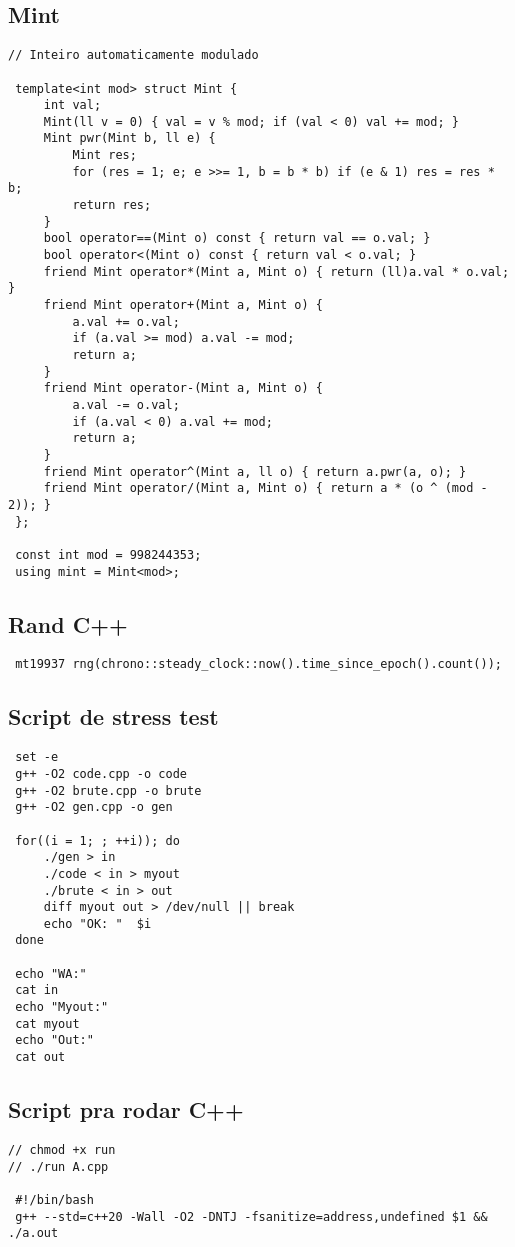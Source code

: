 \documentclass[11pt, a4paper, twoside]{article}
\begin{document}
\subsection{Mint}
\begin{lstlisting}
// Inteiro automaticamente modulado

 template<int mod> struct Mint {
     int val;
     Mint(ll v = 0) { val = v % mod; if (val < 0) val += mod; }
     Mint pwr(Mint b, ll e) {
         Mint res;
         for (res = 1; e; e >>= 1, b = b * b) if (e & 1) res = res * b;
         return res;
     }
     bool operator==(Mint o) const { return val == o.val; }
     bool operator<(Mint o) const { return val < o.val; }
     friend Mint operator*(Mint a, Mint o) { return (ll)a.val * o.val; }
     friend Mint operator+(Mint a, Mint o) {
         a.val += o.val;
         if (a.val >= mod) a.val -= mod;
         return a;
     }
     friend Mint operator-(Mint a, Mint o) {
         a.val -= o.val;
         if (a.val < 0) a.val += mod;
         return a;
     }
     friend Mint operator^(Mint a, ll o) { return a.pwr(a, o); }
     friend Mint operator/(Mint a, Mint o) { return a * (o ^ (mod - 2)); }
 };
 
 const int mod = 998244353;
 using mint = Mint<mod>;
\end{lstlisting}

\subsection{Rand C++}
\begin{lstlisting}
 mt19937 rng(chrono::steady_clock::now().time_since_epoch().count());
\end{lstlisting}

\subsection{Script de stress test}
\begin{lstlisting}
 set -e
 g++ -O2 code.cpp -o code
 g++ -O2 brute.cpp -o brute
 g++ -O2 gen.cpp -o gen
 
 for((i = 1; ; ++i)); do
     ./gen > in
     ./code < in > myout
     ./brute < in > out
     diff myout out > /dev/null || break
     echo "OK: "  $i
 done
 
 echo "WA:"
 cat in
 echo "Myout:"
 cat myout
 echo "Out:"
 cat out
\end{lstlisting}

\subsection{Script pra rodar C++}
\begin{lstlisting}
// chmod +x run
// ./run A.cpp

 #!/bin/bash
 g++ --std=c++20 -Wall -O2 -DNTJ -fsanitize=address,undefined $1 && ./a.out
\end{lstlisting}
\end{document}

